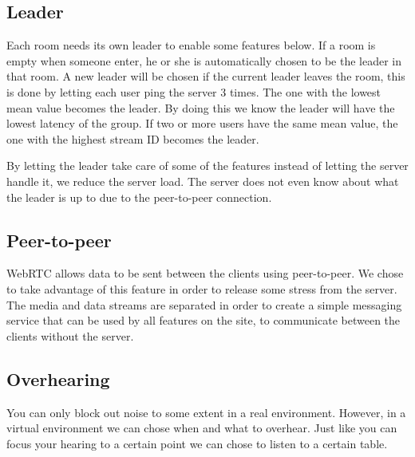 \documentclass[12pt, titlepage]{article}
\begin{document}
\subsection{Leader}
Each room needs its own leader to enable some features below. If a room is empty when someone enter, he or she is automatically chosen to be the leader in that room. A new leader will be chosen if the current leader leaves the room, this is done by letting each user ping the server 3 times. The one with the lowest mean value becomes the leader. By doing this we know the leader will have the lowest latency of the group. If two or more users have the same mean value, the one with the highest stream ID becomes the leader.

By letting the leader take care of some of the features instead of letting the server handle it, we reduce the server load. The server does not even know about what the leader is up to due to the peer-to-peer connection.
\subsection{Peer-to-peer}
WebRTC allows data to be sent between the clients using peer-to-peer. We chose to take advantage of this feature in order to release some stress from the server. The media and data streams are separated in order to create a simple messaging service that can be used by all features on the site, to communicate between the clients without the server.
\subsection{Overhearing}
You can only block out noise to some extent in a real environment. However, in a virtual environment we can chose when and what to overhear. Just like you can focus your hearing to a certain point we can chose to listen to a certain table.
\end{document}
